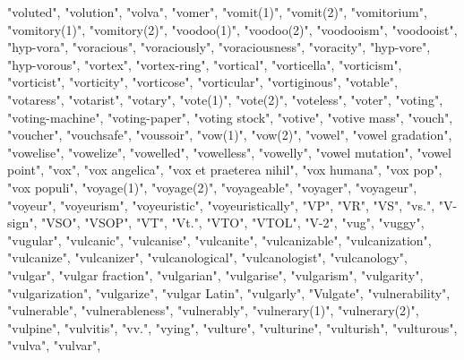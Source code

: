"voluted",
"volution",
"volva",
"vomer",
"vomit(1)",
"vomit(2)",
"vomitorium",
"vomitory(1)",
"vomitory(2)",
"voodoo(1)",
"voodoo(2)",
"voodooism",
"voodooist",
"hyp-vora",
"voracious",
"voraciously",
"voraciousness",
"voracity",
"hyp-vore",
"hyp-vorous",
"vortex",
"vortex-ring",
"vortical",
"vorticella",
"vorticism",
"vorticist",
"vorticity",
"vorticose",
"vorticular",
"vortiginous",
"votable",
"votaress",
"votarist",
"votary",
"vote(1)",
"vote(2)",
"voteless",
"voter",
"voting",
"voting-machine",
"voting-paper",
"voting stock",
"votive",
"votive mass",
"vouch",
"voucher",
"vouchsafe",
"voussoir",
"vow(1)",
"vow(2)",
"vowel",
"vowel gradation",
"vowelise",
"vowelize",
"vowelled",
"vowelless",
"vowelly",
"vowel mutation",
"vowel point",
"vox",
"vox angelica",
"vox et praeterea nihil",
"vox humana",
"vox pop",
"vox populi",
"voyage(1)",
"voyage(2)",
"voyageable",
"voyager",
"voyageur",
"voyeur",
"voyeurism",
"voyeuristic",
"voyeuristically",
"VP",
"VR",
"VS",
"vs.",
"V-sign",
"VSO",
"VSOP",
"VT",
"Vt.",
"VTO",
"VTOL",
"V-2",
"vug",
"vuggy",
"vugular",
"vulcanic",
"vulcanise",
"vulcanite",
"vulcanizable",
"vulcanization",
"vulcanize",
"vulcanizer",
"vulcanological",
"vulcanologist",
"vulcanology",
"vulgar",
"vulgar fraction",
"vulgarian",
"vulgarise",
"vulgarism",
"vulgarity",
"vulgarization",
"vulgarize",
"vulgar Latin",
"vulgarly",
"Vulgate",
"vulnerability",
"vulnerable",
"vulnerableness",
"vulnerably",
"vulnerary(1)",
"vulnerary(2)",
"vulpine",
"vulvitis",
"vv.",
"vying",
"vulture",
"vulturine",
"vulturish",
"vulturous",
"vulva",
"vulvar",
